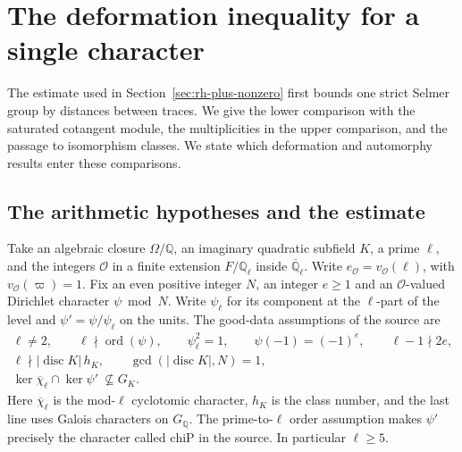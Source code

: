 \section{The deformation inequality for a single character}
\label{sec:single-character}

The estimate used in Section~\ref{sec:rh-plus-nonzero} first bounds one
strict Selmer group by distances between traces. We give the lower
comparison with the saturated cotangent module, the multiplicities in
the upper comparison, and the passage to isomorphism classes. We state
which deformation and automorphy results enter these comparisons.

\subsection{The arithmetic hypotheses and the estimate}

Take an algebraic closure \(\Omega/\mathbb Q\), an imaginary quadratic
subfield \(K\), a prime \(\ell\), and the integers \(\mathcal O\) in a
finite extension \(F/\mathbb Q_\ell\) inside \(\overline{\mathbb Q}_\ell\).
Write \(e_\mathcal O=v_{\mathcal O}(\ell)\), with
\(v_{\mathcal O}(\varpi)=1\). Fix an even positive integer \(N\), an
integer \(e\ge1\) and an \(\mathcal O\)-valued Dirichlet character
\(\psi\bmod N\). Write \(\psi_\ell\) for its component at the
\(\ell\)-part of the level and \(\psi'=\psi/\psi_\ell\) on the units.
The good-data assumptions of the source are
\[
\begin{gathered}
 \ell\ne2,\qquad \ell\nmid\operatorname{ord}(\psi),\qquad
 \psi_\ell^2=1,\qquad \psi(-1)=(-1)^e,\qquad
 \ell-1\nmid 2e,\\
 \ell\nmid |\operatorname{disc}K|\,h_K,\qquad
 \gcd(|\operatorname{disc}K|,N)=1,\\
 \ker\overline\chi_\ell\cap\ker\psi'\ \not\subseteq G_K .
\end{gathered}
\]
Here \(\overline\chi_\ell\) is the mod-\(\ell\) cyclotomic character,
\(h_K\) is the class number, and the last line uses Galois
characters on \(G_{\mathbb Q}\). The prime-to-\(\ell\) order assumption
makes \(\psi'\) precisely the character called \(\mathrm{chiP}\)
in the source. In particular \(\ell\ge5\).

